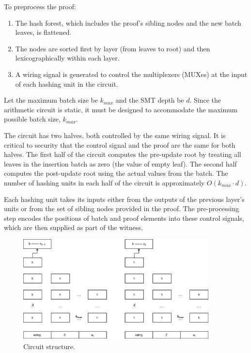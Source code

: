 \documentclass[twocolumn]{article}
\begin{document}
To preprocess the proof:

\begin{enumerate}
    \item The hash forest, which includes the proof's sibling nodes and the new batch leaves, is flattened.
    \item The nodes are sorted first by layer (from leaves to root) and then lexicographically within each layer.
    \item A wiring signal is generated to control the multiplexers (MUXes) at the input of each hashing unit in the circuit.
\end{enumerate}

Let the maximum batch size be $k_{max}$ and the SMT depth be $d$. Since the arithmetic circuit is static, it must be designed to accommodate the maximum possible batch size, $k_{max}$.

The circuit has two halves, both controlled by the same wiring signal. It is critical to security that the control signal and the proof are the same for both halves. The first half of the circuit computes the pre-update root by treating all leaves in the insertion batch as zero (the value of empty leaf). The second half computes the post-update root using the actual values from the batch. The number of hashing units in each half of the circuit is approximately $O(k_{max} \cdot d)$.

Each hashing unit takes its inputs either from the outputs of the previous layer's units or from the set of sibling nodes provided in the proof. The pre-processing step encodes the positions of batch and proof elements into these control signals, which are then supplied as part of the witness.

\begin{figure}[!t]
    \centering
    \includegraphics[width=0.9\textwidth]{pic/smt-circuit.drawio}
    \caption{Circuit structure.}\label{fi:smt-circuit}
\end{figure}
\end{document}

